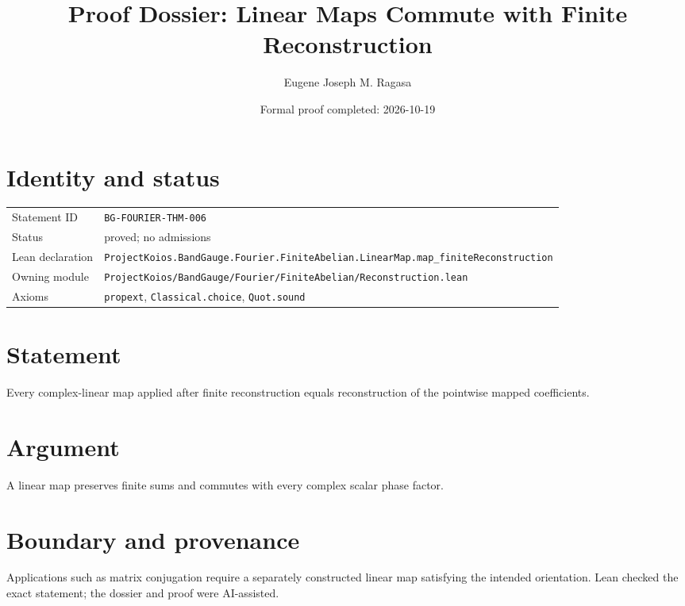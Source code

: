 \documentclass[11pt]{article}
\title{Proof Dossier: Linear Maps Commute with Finite Reconstruction}
\author{Eugene Joseph M. Ragasa}
\date{Formal proof completed: 2026-10-19}
\begin{document}
\maketitle
\section{Identity and status}
\begin{tabularx}{\textwidth}{@{}lX@{}}\toprule
Statement ID & \texttt{BG-FOURIER-THM-006} \\
Status & proved; no admissions \\
Lean declaration & \texttt{ProjectKoios.BandGauge.Fourier.FiniteAbelian.LinearMap.}\newline\texttt{map\_finiteReconstruction} \\
Owning module & \texttt{ProjectKoios/BandGauge/Fourier/FiniteAbelian/Reconstruction.lean} \\
Axioms & \texttt{propext}, \texttt{Classical.choice}, \texttt{Quot.sound} \\
\bottomrule\end{tabularx}
\section{Statement}
Every complex-linear map applied after finite reconstruction equals reconstruction of the pointwise mapped coefficients.
\section{Argument}
A linear map preserves finite sums and commutes with every complex scalar phase factor.
\section{Boundary and provenance}
Applications such as matrix conjugation require a separately constructed linear map satisfying the intended orientation. Lean checked the exact statement; the dossier and proof were AI-assisted.
\end{document}
